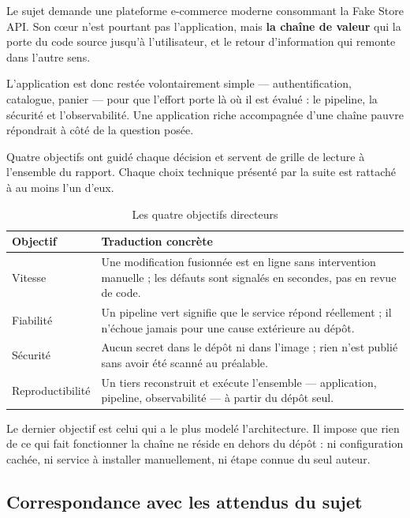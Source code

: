 \documentclass[11pt,a4paper]{article}
\begin{document}
Le sujet demande une plateforme e-commerce moderne consommant la Fake Store
API. Son cœur n'est pourtant pas l'application, mais \textbf{la chaîne de
valeur} qui la porte du code source jusqu'à l'utilisateur, et le retour
d'information qui remonte dans l'autre sens.

L'application est donc restée volontairement simple — authentification,
catalogue, panier — pour que l'effort porte là où il est évalué : le
pipeline, la sécurité et l'observabilité. Une application riche accompagnée
d'une chaîne pauvre répondrait à côté de la question posée.

Quatre objectifs ont guidé chaque décision et servent de grille de lecture à
l'ensemble du rapport. Chaque choix technique présenté par la suite est
rattaché à au moins l'un d'eux.

\begin{table}[htbp]
\centering
\begin{tabularx}{\linewidth}{@{}l X@{}}
\toprule
\textbf{Objectif} & \textbf{Traduction concrète} \\
\midrule
Vitesse & Une modification fusionnée est en ligne sans intervention manuelle ; les défauts sont signalés en secondes, pas en revue de code. \\
Fiabilité & Un pipeline vert signifie que le service répond réellement ; il n'échoue jamais pour une cause extérieure au dépôt. \\
Sécurité & Aucun secret dans le dépôt ni dans l'image ; rien n'est publié sans avoir été scanné au préalable. \\
Reproductibilité & Un tiers reconstruit et exécute l'ensemble — application, pipeline, observabilité — à partir du dépôt seul. \\
\bottomrule
\end{tabularx}
\caption{Les quatre objectifs directeurs}
\end{table}

Le dernier objectif est celui qui a le plus modelé l'architecture. Il impose
que rien de ce qui fait fonctionner la chaîne ne réside en dehors du dépôt :
ni configuration cachée, ni service à installer manuellement, ni étape
connue du seul auteur.

\subsection*{Correspondance avec les attendus du sujet}
\end{document}

